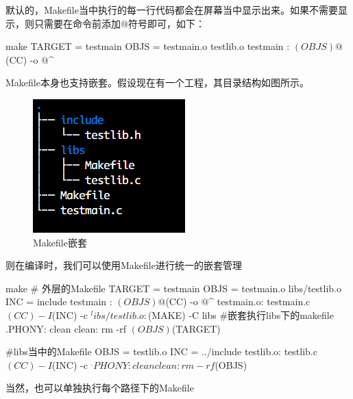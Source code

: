 默认的，Makefile当中执行的每一行代码都会在屏幕当中显示出来。如果不需要显示，则只需要在命令前添加@符号即可，如下：
\begin{code-block}{make}
TARGET = testmain
OBJS = testmain.o testlib.o
testmain : $(OBJS)
        @$(CC) -o $@ $^
\end{code-block}

Makefile本身也支持嵌套。假设现在有一个工程，其目录结构如图所示。
\begin{figure}[H]
  \centering
  \includegraphics[scale=1.5]{make.png}
  \caption{Makefile嵌套}
  \label{fig:submake}
\end{figure}

则在编译时，我们可以使用Makefile进行统一的嵌套管理
\begin{code-block}{make}
# 外层的Makefile
TARGET = testmain
OBJS = testmain.o libs/testlib.o
INC = include
testmain : $(OBJS)
        @$(CC) -o $@ $^
testmain.o: testmain.c
        $(CC) -I$(INC) -c $^
libs/testlib.o:
        $(MAKE) -C libs #嵌套执行libs下的makefile
.PHONY: clean
clean:
        rm -rf $(OBJS) $(TARGET)

#libs当中的Makefile
OBJS = testlib.o
INC = ../include
testlib.o: testlib.c
        $(CC) -I$(INC) -c $^
.PHONY: clean
clean:
        rm -rf $(OBJS)
\end{code-block}

当然，也可以单独执行每个路径下的Makefile
